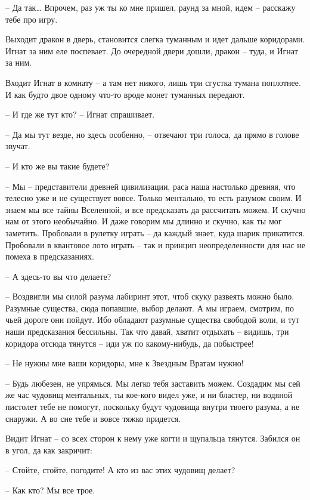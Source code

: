 \documentclass[ebook,oneside,final,openright]{memoir}
\begin{document}
– Да так… Впрочем, раз уж ты ко мне пришел, раунд за мной, идем – расскажу тебе про игру.\par
\par
Выходит дракон в дверь, становится слегка туманным и идет дальше коридорами. Игнат за ним еле поспевает. До очередной двери дошли, дракон – туда, и Игнат за ним. \par
Входит Игнат в комнату – а там нет никого, лишь три сгустка тумана поплотнее. И как будто двое одному что-то вроде монет туманных передают.\par
– И где же тут кто? – Игнат спрашивает.\par
– Да мы тут везде, но здесь особенно, – отвечают три голоса, да прямо в голове звучат.\par
– И кто же вы такие будете?\par
– Мы – представители древней цивилизации, раса наша настолько древняя, что телесно уже и не существует вовсе. Только ментально, то есть разумом своим. И знаем мы все тайны Вселенной, и все предсказать да рассчитать можем. И скучно нам от этого необычайно. И даже говорим мы длинно и скучно, как ты мог заметить. Пробовали в рулетку играть – да каждый знает, куда шарик прикатится. Пробовали в квантовое лото играть – так и принцип неопределенности для нас не помеха в предсказаниях.\par
– А здесь-то вы что делаете?\par
– Воздвигли мы силой разума лабиринт этот, чтоб скуку развеять можно было. Разумные существа, сюда попавшие, выбор делают. А мы играем, смотрим, по чьей дороге они пойдут. Ибо обладают разумные существа свободой воли, и тут наши предсказания бессильны. Так что давай, хватит отдыхать – видишь, три коридора отсюда тянутся – иди уж по какому-нибудь, да побыстрее!\par
– Не нужны мне ваши коридоры, мне к Звездным Вратам нужно!\par
– Будь любезен, не упрямься. Мы легко тебя заставить можем. Создадим мы сей же час чудовищ ментальных, ты кое-кого видел уже, и ни бластер, ни водяной пистолет тебе не помогут, поскольку будут чудовища внутри твоего разума, а не снаружи. А во сне тебе и вовсе тяжко придется.\par
\par
Видит Игнат – со всех сторон к нему уже когти и щупальца тянутся. Забился он в угол, да как закричит:\par
– Стойте, стойте, погодите! А кто из вас этих чудовищ делает?\par
– Как кто? Мы все трое.\par
\end{document}
